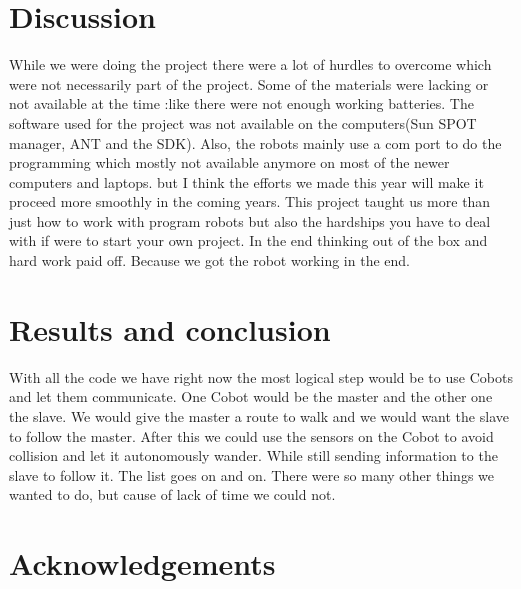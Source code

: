 \documentclass[a4paper,10pt]{article} %
\begin{document}

\section{Discussion} %
While we were doing the project there were a lot of hurdles to overcome which
were not necessarily part of the project. Some of the materials were lacking
or not available at the time :like there were not enough working batteries.
The software used for the project was not available on the computers(Sun SPOT
manager, ANT and the SDK). Also,
the robots mainly use a com port to do the programming which mostly not
available anymore on most of the newer computers and laptops. but I think 
the efforts we made this year will make it proceed more smoothly in the coming
years. This project taught us more than just how to work with program robots
but also the hardships you have to deal with if were to start your own project.
In the end thinking out of the box and hard work paid off. Because we
got the robot working in the end.  

\section{Results and conclusion} %



With all the code we have right now the most logical step would be to use Cobots
and let them communicate. One Cobot would be the master and the other one the
slave. We would give the master a route to walk and we would want the slave to
follow the master. After this we could use the sensors on the Cobot to avoid
collision and let it autonomously wander. While still sending information to the
slave to follow it. The list goes on and on. There were so many other things we
wanted to do, but cause of lack of time we could not.



\section{Acknowledgements} %
\end{document}
